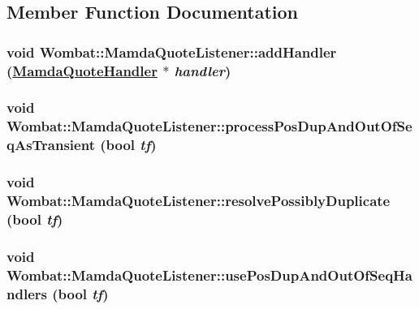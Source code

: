 \subsection{Member Function Documentation}
\hypertarget{classWombat_1_1MamdaQuoteListener_4576a9bd2d264d2072a9825eabc348f1}{
\subsubsection[addHandler]{\setlength{\rightskip}{0pt plus 5cm}void Wombat::Mamda\-Quote\-Listener::add\-Handler (\hyperlink{classWombat_1_1MamdaQuoteHandler}{Mamda\-Quote\-Handler} $\ast$ {\em handler})}}
\label{classWombat_1_1MamdaQuoteListener_4576a9bd2d264d2072a9825eabc348f1}


\hypertarget{classWombat_1_1MamdaQuoteListener_7a4ec42c2a90846db4f55e74d41e456c}{
\subsubsection[processPosDupAndOutOfSeqAsTransient]{\setlength{\rightskip}{0pt plus 5cm}void Wombat::Mamda\-Quote\-Listener::process\-Pos\-Dup\-And\-Out\-Of\-Seq\-As\-Transient (bool {\em tf})}}
\label{classWombat_1_1MamdaQuoteListener_7a4ec42c2a90846db4f55e74d41e456c}


\hypertarget{classWombat_1_1MamdaQuoteListener_1ab499ae23c87f687a7b27d4de0a52df}{
\subsubsection[resolvePossiblyDuplicate]{\setlength{\rightskip}{0pt plus 5cm}void Wombat::Mamda\-Quote\-Listener::resolve\-Possibly\-Duplicate (bool {\em tf})}}
\label{classWombat_1_1MamdaQuoteListener_1ab499ae23c87f687a7b27d4de0a52df}


\hypertarget{classWombat_1_1MamdaQuoteListener_7daf84de8c0a48b6a227ef4f2c819991}{
\subsubsection[usePosDupAndOutOfSeqHandlers]{\setlength{\rightskip}{0pt plus 5cm}void Wombat::Mamda\-Quote\-Listener::use\-Pos\-Dup\-And\-Out\-Of\-Seq\-Handlers (bool {\em tf})}}
\label{classWombat_1_1MamdaQuoteListener_7daf84de8c0a48b6a227ef4f2c819991}


